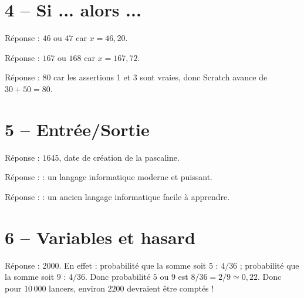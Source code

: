 \documentclass[class=report,crop=false, 12pt]{standalone}
\begin{document}
\section*{4 -- Si ... alors ...}

\setcounter{enigme}{0}

\begin{enigme}
Réponse : $46$ ou $47$ car $x=46,20$.
\end{enigme}

\begin{enigme}
Réponse : $167$ ou $168$ car $x=167,72$.
\end{enigme}

\begin{enigme}
Réponse : $80$ car les assertions 1 et 3 sont vraies, donc Scratch avance de $30+50=80$.
\end{enigme}


\section*{5 -- Entrée/Sortie}

\setcounter{enigme}{0}

\begin{enigme}
Réponse : $1645$, date de création de la pascaline.
\end{enigme}

\begin{enigme}
Réponse : \og {} \fg{} : un langage informatique moderne et puissant.
\end{enigme}

\begin{enigme}
Réponse : \og {} \fg{} : un ancien langage informatique facile à apprendre.
\end{enigme}


\section*{6 -- Variables et hasard}

\setcounter{enigme}{0}

\begin{enigme}
Réponse : 2000. En effet : probabilité que la somme soit $5$ : $4/36$ ; probabilité que la somme soit $9$ : $4/36$.
Donc probabilité $5$ ou $9$ est $8/36 = 2/9 \simeq 0,22$.
Donc pour $10 \, 000$ lancers, environ $2200$ devraient être comptés !
\end{enigme}
\end{document}

